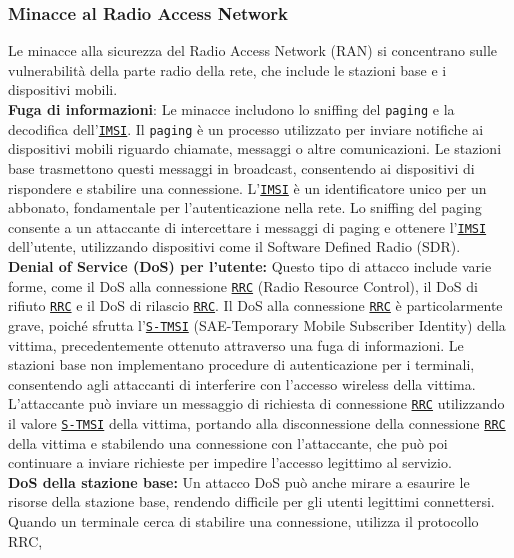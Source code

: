 \documentclass[english]{article}
\begin{document}
\subsubsection{Minacce al Radio Access Network}
Le minacce alla sicurezza del Radio Access Network (RAN) si concentrano sulle
vulnerabilità della parte radio della rete, che include le stazioni base e i
dispositivi mobili. \\[0.2cm]
\textbf{Fuga di informazioni}:
Le minacce includono lo sniffing del \texttt{paging} e la decodifica
dell'\texttt{\hyperlink{IMSI}{IMSI}}.\@
Il \texttt{paging} è un processo utilizzato per inviare notifiche ai dispositivi mobili
riguardo chiamate, messaggi o altre comunicazioni. Le stazioni base trasmettono questi
messaggi in broadcast, consentendo ai dispositivi di rispondere e stabilire una connessione.
L'\texttt{\hyperlink{IMSI}{IMSI}} è un identificatore unico per un abbonato,
fondamentale per l'autenticazione nella rete.
Lo sniffing del paging consente a un attaccante
di intercettare i messaggi di paging e ottenere l'\texttt{\hyperlink{IMSI}{IMSI}} dell'utente,
utilizzando dispositivi come il Software Defined Radio (SDR).
\\[0.2cm]
\textbf{Denial of Service (DoS) per l'utente:} Questo tipo di attacco include varie forme,
come il DoS alla connessione \texttt{\hyperlink{RRC}{RRC}} (Radio Resource Control),
il DoS di rifiuto \texttt{\hyperlink{RRC}{RRC}}
e il DoS di rilascio \texttt{\hyperlink{RRC}{RRC}}.\@
Il DoS alla connessione \texttt{\hyperlink{RRC}{RRC}} è particolarmente grave, poiché sfrutta
l'\texttt{\hyperlink{S-TMSI}{S-TMSI}} (SAE-Temporary Mobile Subscriber Identity)
della vittima, precedentemente ottenuto attraverso una fuga di informazioni.
Le stazioni base non implementano procedure di autenticazione per i terminali,
consentendo agli attaccanti di interferire con l'accesso wireless della vittima.
L'attaccante può inviare un messaggio di richiesta di connessione
\texttt{\hyperlink{RRC}{RRC}} utilizzando il valore
\texttt{\hyperlink{S-TMSI}{S-TMSI}} della vittima, portando alla disconnessione della connessione
\texttt{\hyperlink{RRC}{RRC}} della vittima e stabilendo una connessione con l'attaccante,
che può poi continuare a inviare richieste per impedire l'accesso legittimo al servizio.
\\[0.2cm]
\textbf{DoS della stazione base:} Un attacco DoS può anche mirare a esaurire le risorse
della stazione base, rendendo difficile per gli utenti legittimi connettersi.
Quando un terminale cerca di stabilire una connessione, utilizza il protocollo RRC,
\end{document}
